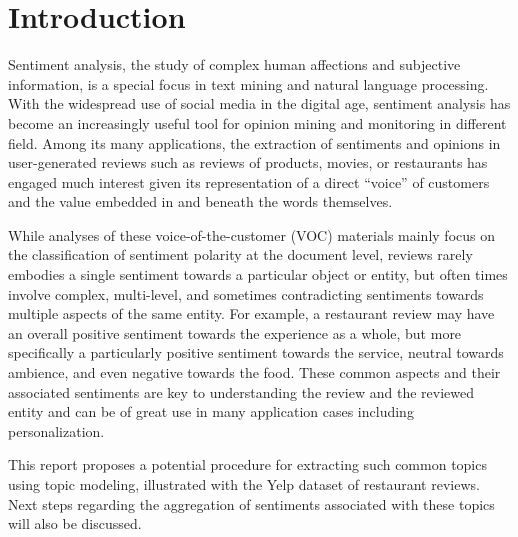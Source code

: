 \documentclass[12pt,twoside]{dukestatscithesis}
\title{}
\author{}
\date{}
\theoremstyle{definition}
\theoremstyle{definition}
\theoremstyle{definition}
\theoremstyle{remark}
\begin{document}

\frontmatter %
\pagestyle{empty} %



  \hypersetup{linkcolor=black}
  \setcounter{tocdepth}{2}
  \tableofcontents





\mainmatter %
\pagestyle{fancyplain} %

\chapter{Introduction}\label{intro}

Sentiment analysis, the study of complex human affections and subjective
information, is a special focus in text mining and natural language
processing. With the widespread use of social media in the digital age,
sentiment analysis has become an increasingly useful tool for opinion
mining and monitoring in different field. Among its many applications,
the extraction of sentiments and opinions in user-generated reviews such
as reviews of products, movies, or restaurants has engaged much interest
given its representation of a direct ``voice'' of customers and the
value embedded in and beneath the words themselves.

While analyses of these voice-of-the-customer (VOC) materials mainly
focus on the classification of sentiment polarity at the document level,
reviews rarely embodies a single sentiment towards a particular object
or entity, but often times involve complex, multi-level, and sometimes
contradicting sentiments towards multiple aspects of the same entity.
For example, a restaurant review may have an overall positive sentiment
towards the experience as a whole, but more specifically a particularly
positive sentiment towards the service, neutral towards ambience, and
even negative towards the food. These common aspects and their
associated sentiments are key to understanding the review and the
reviewed entity and can be of great use in many application cases
including personalization.

This report proposes a potential procedure for extracting such common
topics using topic modeling, illustrated with the Yelp dataset of
restaurant reviews. Next steps regarding the aggregation of sentiments
associated with these topics will also be discussed.
\end{document}
